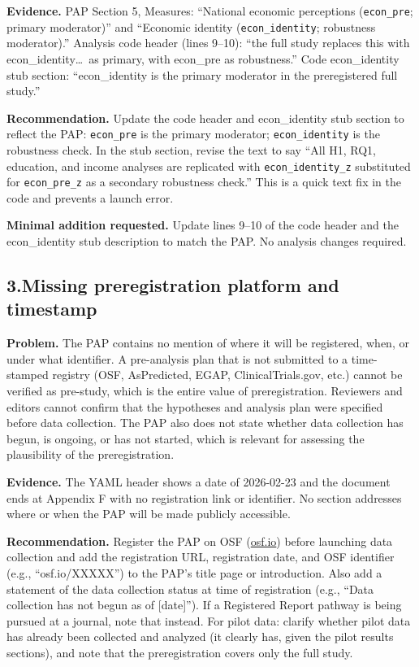 \documentclass[11pt]{article}
\begin{document}
\textbf{Evidence.} PAP Section 5, Measures: ``National economic perceptions (\texttt{econ\_pre}; primary moderator)'' and ``Economic identity (\texttt{econ\_identity}; robustness moderator).'' Analysis code header (lines 9--10): ``the full study replaces this with econ\_identity\ldots\ as primary, with econ\_pre as robustness.'' Code econ\_identity stub section: ``econ\_identity is the primary moderator in the preregistered full study.''

\textbf{Recommendation.} Update the code header and econ\_identity stub section to reflect the PAP: \texttt{econ\_pre} is the primary moderator; \texttt{econ\_identity} is the robustness check. In the stub section, revise the text to say ``All H1, RQ1, education, and income analyses are replicated with \texttt{econ\_identity\_z} substituted for \texttt{econ\_pre\_z} as a secondary robustness check.'' This is a quick text fix in the code and prevents a launch error.

\textbf{Minimal addition requested.} Update lines 9--10 of the code header and the econ\_identity stub description to match the PAP. No analysis changes required.

\bigskip

\subsection*{3.\enspace Missing preregistration platform and timestamp}

\textbf{Problem.} The PAP contains no mention of where it will be registered, when, or under what identifier. A pre-analysis plan that is not submitted to a time-stamped registry (OSF, AsPredicted, EGAP, ClinicalTrials.gov, etc.) cannot be verified as pre-study, which is the entire value of preregistration. Reviewers and editors cannot confirm that the hypotheses and analysis plan were specified before data collection. The PAP also does not state whether data collection has begun, is ongoing, or has not started, which is relevant for assessing the plausibility of the preregistration.

\textbf{Evidence.} The YAML header shows a date of 2026-02-23 and the document ends at Appendix F with no registration link or identifier. No section addresses where or when the PAP will be made publicly accessible.

\textbf{Recommendation.} Register the PAP on OSF (\href{https://osf.io}{osf.io}) before launching data collection and add the registration URL, registration date, and OSF identifier (e.g., ``osf.io/XXXXX'') to the PAP's title page or introduction. Also add a statement of the data collection status at time of registration (e.g., ``Data collection has not begun as of [date]''). If a Registered Report pathway is being pursued at a journal, note that instead. For pilot data: clarify whether pilot data has already been collected and analyzed (it clearly has, given the pilot results sections), and note that the preregistration covers only the full study.
\end{document}
